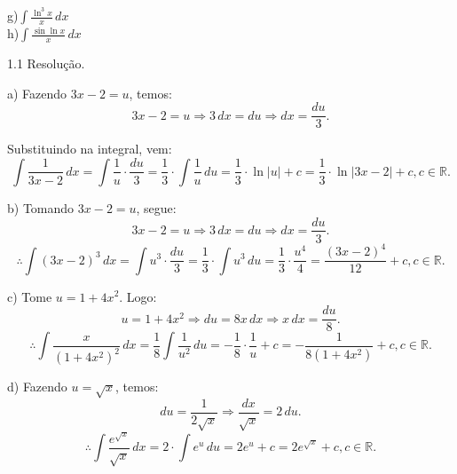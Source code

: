 \documentclass{article}
\begin{document}
{\begin{newpage}
\begin{multicols}{4}
g)$\displaystyle{\int \frac{\ln^{3}{x}}{x}\, dx}$\\
h)$\displaystyle{\int \frac{\sin{\ln{x}}}{x}\, dx}$
\end{multicols}
\par
\vspace{0.3cm}
\begin{flushleft}
1.1 Resolução.
\end{flushleft}
\par a) Fazendo $3x - 2 = u$, temos:
\begin{equation*} \displaystyle{3x - 2 = u \Rightarrow 3\, dx = du \Rightarrow dx = \frac{du}{3}}. \end{equation*}
\par Substituindo na integral, vem:
\begin{equation*} \displaystyle{\int \frac{1}{3x - 2}\, dx = \int \frac{1}{u}\cdot\frac{du}{3} = \frac{1}{3}\cdot\int \frac{1}{u}\, du = \frac{1}{3}\cdot\ln{|u|} + c = \frac{1}{3}\cdot\ln{|3x-2|} + c, c\in\mathbb{R}}.\end{equation*}
\par
\vspace{0.3cm}
b) Tomando $3x - 2 = u$, segue:
\begin{equation*} 3x - 2 = u \Rightarrow 3\, dx = du \Rightarrow \displaystyle{dx = \frac{du}{3}}.\end{equation*}
$$\therefore \displaystyle{\int (3x - 2)^{3}\, dx = \int u^{3}\cdot\frac{du}{3} = \frac{1}{3}\cdot\int u^{3}\, du = \frac{1}{3}\cdot\frac{u^{4}}{4} = \frac{(3x - 2)^{4}}{12} + c, c\in\mathbb{R}}.$$
\par
\vspace{0.3cm}
c) Tome $u = 1 + 4x^2$. Logo:
\begin{equation*} u = 1 + 4x^2 \Rightarrow du = 8x\, dx \Rightarrow \displaystyle{x\, dx = \frac{du}{8}}.\end{equation*}
$$\therefore \displaystyle{\int \frac{x}{(1 + 4x^{2})^2}\, dx = \frac{1}{8}\int \frac{1}{u^2}\, du = -\frac{1}{8}\cdot\frac{1}{u} + c  = -\frac{1}{8(1 + 4x^2)} + c, c\in\mathbb{R}}.$$
\par
\vspace{0.3cm}
d) Fazendo $u = \sqrt{x}$, temos:
\begin{equation*} \displaystyle{du = \frac{1}{2\sqrt{x}} \Rightarrow \frac{dx}{\sqrt{x}} = 2\, du}.\end{equation*}
$$\therefore \displaystyle{\int \frac{e^{\sqrt{x}}}{\sqrt{x}}\, dx = 2\cdot\int e^{u}\, du = 2e^{u} + c = 2e^{\sqrt{x}} + c, c\in\mathbb{R}}.$$

\end{newpage}}
\end{document}
